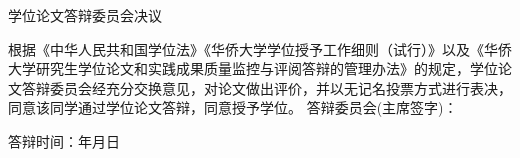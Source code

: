 {
    \begin{center}
        \sffamily\fontsize{16pt}{25pt}\selectfont 学\hspace{8pt}位\hspace{8pt}论\hspace{8pt}文\hspace{8pt}答\hspace{8pt}辩\hspace{8pt}委\hspace{8pt}员\hspace{8pt}会\hspace{8pt}决\hspace{8pt}议
    \end{center}
} \vspace{32pt}
{
    \fontsize{14pt}{26pt}\selectfont
    \noindent\hspace{28pt}\rmfamily 根据《中华人民共和国学位法》《华侨大学学位授予工作细则（试行）》以及《华侨大学研究生学位论文和实践成果质量监控与评阅答辩的管理办法》的规定，学位论文答辩委员会经充分交换意见，对论文做出评价，并以无记名投票方式进行表决，同意该同学通过\degree 学位论文答辩，同意授予\degree 学位。
    \vspace{192pt}
    \noindent\flushright 答辩委员会(主席签字)：\underline{\hspace{156pt}}\vspace{14pt} \par
    \noindent\flushright 答辩时间：\underline{\hspace{60pt}}年\underline{\hspace{25pt}}月\underline{\hspace{25pt}}日 \par
}
